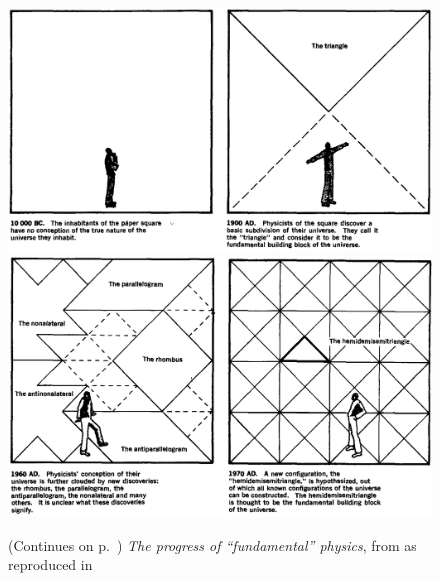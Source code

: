 \documentclass[a4paper,12pt,%
onecolumn,oneside,titlepage,%
british%
]{memoir}
\renewcommand*{\|}[1][]{\nonscript\:#1\vert\nonscript\:\mathopen{}}
\begin{document}
\begin{figure}[p]
  \centering
  \includegraphics[width=1.2\textwidth]{chew1.png}
  \\[1em]  \includegraphics[width=1.2\textwidth]{chew2.png}
  \caption{(Continues on p.~\pageref{fig:chew2}) \emph{The progress of \enquote{fundamental} physics}, from \cites{chew1970} as reproduced in \cites{truesdell1984_r1987}}
  \label{fig:chew1}
\end{figure}
\end{document}

